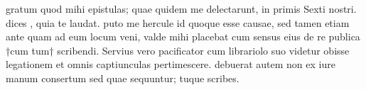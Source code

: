 


gratum quod mihi epistulas; quae quidem me delectarunt, in primis
              Sexti nostri. dices , quia te laudat. puto me hercule id quoque esse causae, sed tamen etiam ante quam ad eum
            locum veni, valde mihi placebat cum sensus eius de re publica †cum
            tum† scribendi. Servius vero pacificator cum librariolo suo
            videtur obisse legationem et omnis captiunculas pertimescere. debuerat autem
            non ex iure manum consertum sed quae sequuntur; tuque scribes.
